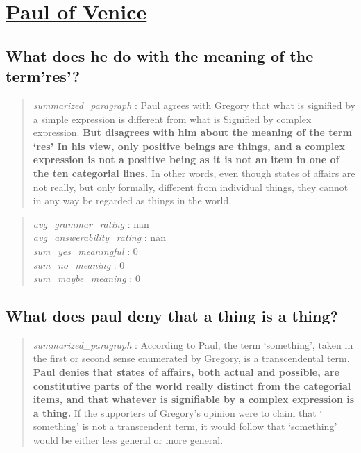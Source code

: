 \hypertarget{paul-of-venice}{%
\section{\texorpdfstring{\href{https://plato.stanford.edu/entries/paul-venice/index.html}{Paul
of Venice}}{Paul of Venice}}\label{paul-of-venice}}

\hypertarget{what-does-he-do-with-the-meaning-of-the-termres}{%
\subsection{What does he do with the meaning of the
term'res'?}\label{what-does-he-do-with-the-meaning-of-the-termres}}

\begin{quote}
\emph{summarized\_paragraph} : Paul agrees with Gregory that what is
signified by a simple expression is different from what is Signified by
complex expression. \textbf{But disagrees with him about the meaning of
the term `res' In his view, only positive beings are things, and a
complex expression is not a positive being as it is not an item in one
of the ten categorial lines.} In other words, even though states of
affairs are not really, but only formally, different from individual
things, they cannot in any way be regarded as things in the world.
\end{quote}

\begin{quote}
\emph{avg\_grammar\_rating} : nan\\
\emph{avg\_answerability\_rating} : nan\\
\emph{sum\_yes\_meaningful} : 0\\
\emph{sum\_no\_meaning} : 0\\
\emph{sum\_maybe\_meaning} : 0
\end{quote}

\hypertarget{what-does-paul-deny-that-a-thing-is-a-thing}{%
\subsection{What does paul deny that a thing is a
thing?}\label{what-does-paul-deny-that-a-thing-is-a-thing}}

\begin{quote}
\emph{summarized\_paragraph} : According to Paul, the term `something',
taken in the first or second sense enumerated by Gregory, is a
transcendental term. \textbf{Paul denies that states of affairs, both
actual and possible, are constitutive parts of the world really distinct
from the categorial items, and that whatever is signifiable by a complex
expression is a thing.} If the supporters of Gregory's opinion were to
claim that ` something' is not a transcendent term, it would follow that
`something' would be either less general or more general.
\end{quote}

